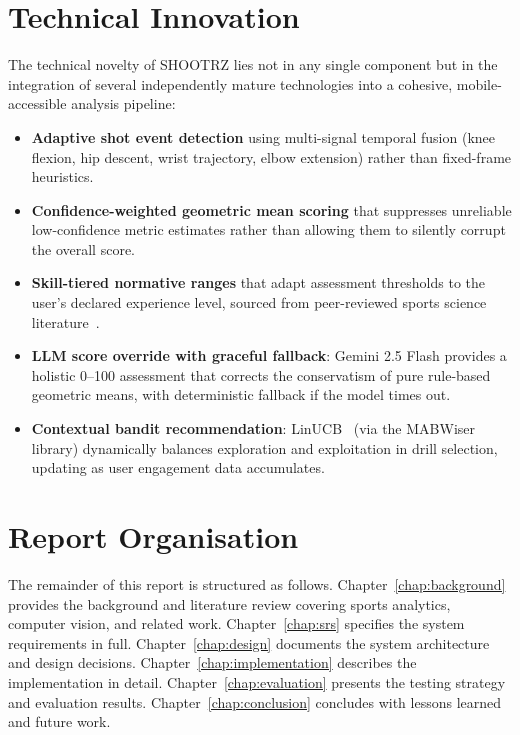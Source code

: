 \section{Technical Innovation}
\label{sec:innovation}

The technical novelty of SHOOTRZ lies not in any single component but in the integration of several independently mature technologies into a cohesive, mobile-accessible analysis pipeline:

\begin{itemize}
  \item \textbf{Adaptive shot event detection} using multi-signal temporal fusion (knee flexion, hip descent, wrist trajectory, elbow extension) rather than fixed-frame heuristics.
  \item \textbf{Confidence-weighted geometric mean scoring} that suppresses unreliable low-confidence metric estimates rather than allowing them to silently corrupt the overall score.
  \item \textbf{Skill-tiered normative ranges} that adapt assessment thresholds to the user's declared experience level, sourced from peer-reviewed sports science literature~\cite{Cabarkapa2021,Okazaki2012,Struzik2014}.
  \item \textbf{LLM score override with graceful fallback}: Gemini 2.5 Flash provides a holistic 0--100 assessment that corrects the conservatism of pure rule-based geometric means, with deterministic fallback if the model times out.
  \item \textbf{Contextual bandit recommendation}: LinUCB~\cite{Li2010} (via the MABWiser library) dynamically balances exploration and exploitation in drill selection, updating as user engagement data accumulates.
\end{itemize}

\section{Report Organisation}
\label{sec:organisation}

The remainder of this report is structured as follows. Chapter~\ref{chap:background} provides the background and literature review covering sports analytics, computer vision, and related work. Chapter~\ref{chap:srs} specifies the system requirements in full. Chapter~\ref{chap:design} documents the system architecture and design decisions. Chapter~\ref{chap:implementation} describes the implementation in detail. Chapter~\ref{chap:evaluation} presents the testing strategy and evaluation results. Chapter~\ref{chap:conclusion} concludes with lessons learned and future work.
